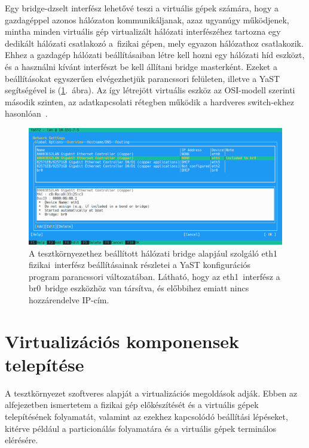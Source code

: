 Egy bridge-dzselt interfész lehetővé teszi a virtuális gépek számára, hogy a gazdagéppel azonos hálózaton kommunikáljanak, azaz ugyanúgy működjenek, mintha minden virtuális gép virtualizált hálózati interfészéhez tartozna egy dedikált hálózati csatlakozó a~fizikai gépen, mely egyazon hálózathoz csatlakozik. Ehhez a gazdagép hálózati beállításaiban létre kell hozni egy hálózati híd eszközt, és a használni kívánt interfészt be kell állítani bridge masterként.
Ezeket a beállításokat egyszerűen elvégezhetjük parancssori felületen, illetve a YaST segítségével is (\ref{fig:yast-net-bridge}.~ábra). Az így létrejött virtuális eszköz az OSI-modell szerinti második szinten, az adatkapcsolati rétegben működik a hardveres switch-ekhez hasonlóan~\cite{SUSENetBridge}.

\begin{figure}[ht]
	\centering
	\includegraphics[width=15cm]{figures/yast-br0.png}
	\caption{A tesztkörnyezethez beállított hálózati bridge alapjául szolgáló eth1 fizikai~interfész beállításainak részletei a YaST konfigurációs program parancssori változatában. Látható, hogy az eth1~interfész a br0~bridge eszközhöz van társítva, és előbbihez emiatt nincs hozzárendelve IP-cím.}
	\label{fig:yast-net-bridge}
\end{figure}

\section{Virtualizációs komponensek telepítése}
A tesztkörnyezet szoftveres alapját a virtualizációs megoldások adják. Ebben az alfejezetben ismertetem a fizikai gép előkészítését és a virtuális gépek telepítésének folyamatát, valamint az ezekhez kapcsolódó beállítási lépéseket, kitérve például a particionálás folyamatára és a virtuális gépek terminálos elérésére.

